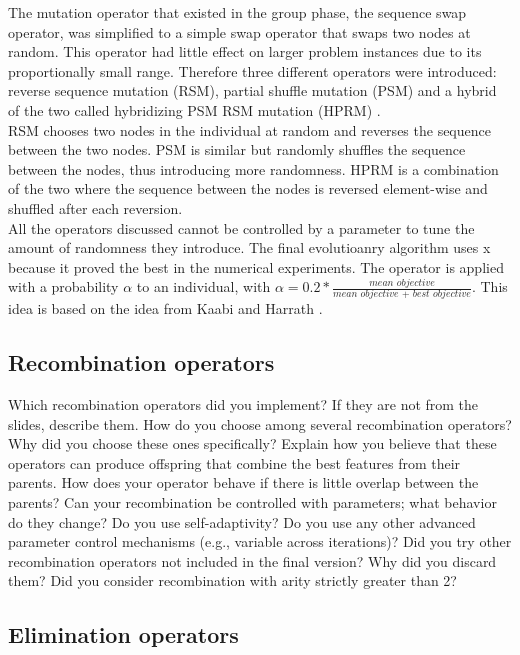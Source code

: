 \documentclass[a4paper,10pt]{article}
\newcommand{\ReplaceMe}[1]{{\color{blue}#1}}
\begin{document}
The mutation operator that existed in the group phase, the sequence swap operator, was simplified to a simple swap operator that swaps two nodes at random. This operator had little effect on larger problem instances due to its proportionally small range. Therefore three different operators were introduced: reverse sequence mutation (RSM), partial shuffle mutation (PSM) and a hybrid of the two called hybridizing PSM RSM mutation (HPRM) \cite{hprm}.\\
RSM chooses two nodes in the individual at random and reverses the sequence between the two nodes. PSM is similar but randomly shuffles the sequence between the nodes, thus introducing more randomness. HPRM is a combination of the two where the sequence between the nodes is reversed element-wise and shuffled after each reversion.\\
All the operators discussed cannot be controlled by a parameter to tune the amount of randomness they introduce. The final evolutioanry algorithm uses \ReplaceMe{x} because it proved the best in the numerical experiments. The operator is applied with a probability $\alpha$ to an individual, with $\alpha = 0.2 *\frac{ \textit{mean objective}}{\textit{mean objective } + \textit{ best objective}}$. This idea is based on the idea from Kaabi and Harrath \cite{ann}. 

\subsection{Recombination operators}

\ReplaceMe{Which recombination operators did you implement? If they are not from the slides, describe them. How do you choose among several recombination operators? Why did you choose these ones specifically? Explain how you believe that these operators can produce offspring that combine the best features from their parents. How does your operator behave if there is little overlap between the parents? Can your recombination be controlled with parameters; what behavior do they change? Do you use self-adaptivity? Do you use any other advanced parameter control mechanisms (e.g., variable across iterations)? Did you try other recombination operators not included in the final version? Why did you discard them? Did you consider recombination with arity strictly greater than 2?}



\subsection{Elimination operators}
\end{document}

